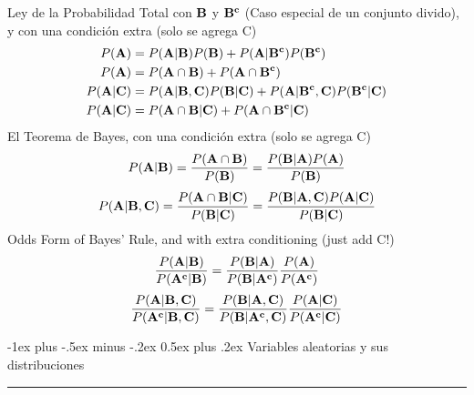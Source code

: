 \documentclass[10pt,landscape]{article}
\makeatletter
\renewcommand{\section}{\@startsection{section}{1}{0mm}%
                                {-1ex plus -.5ex minus -.2ex}%
                                {0.5ex plus .2ex}%
                                {\normalfont\large\bfseries}}
\renewcommand{\subsection}{\@startsection{subsection}{2}{0mm}%
                                {-1explus -.5ex minus -.2ex}%
                                {0.5ex plus .2ex}%
                                {\normalfont\normalsize\bfseries}}
\makeatother
\begin{document}
\begin{multicols}{3}
Ley de la Probabilidad Total con ${\bf B}$ y ${\bf B^c}$ (Caso especial de un conjunto divido), y con una condición extra (solo se agrega C)
   \begin{align*} 
P({\bf A}) &= P({\bf A} | {\bf B})P({\bf B}) + P({\bf A} | {\bf B^c})P({\bf B^c}) \\
P({\bf A}) &= P({\bf A} \cap {\bf B})+ P({\bf A} \cap {\bf B^c}) \\
P({\bf A} | {\bf C}) &= P({\bf A} | {\bf B}, {\bf C})P({\bf B} | {\bf C}) + P({\bf A} | {\bf B^c}, {\bf C})P({\bf B^c} | {\bf C}) \\
P({\bf A} | {\bf C}) &= P({\bf A} \cap {\bf B} | {\bf C})+ P({\bf A} \cap {\bf B^c} | {\bf C})
   \end{align*} 
El Teorema de Bayes, con una condición extra (solo se agrega C)
         \[P({\bf A}|{\bf B}) = \frac{P({\bf A} \cap {\bf B})}{P({\bf B})} = \frac{P({\bf B}|{\bf A})P({\bf A})}{P({\bf B})}\]
         \[P({\bf A}|{\bf B}, {\bf C}) = \frac{P({\bf A} \cap {\bf B} | {\bf C})}{P({\bf B} | {\bf C})} = \frac{P({\bf B}|{\bf A}, {\bf C})P({\bf A} | {\bf C})}{P({\bf B} | {\bf C})}\]
Odds Form of Bayes' Rule, and with extra conditioning (just add C!)
\[\frac{P({\bf A}| {\bf B})}{P({\bf A^c}| {\bf B})} = \frac{P({\bf B}|{\bf A})}{P({\bf B}| {\bf A^c})}\frac{P({\bf A})}{P({\bf A^c})}\]
\[\frac{P({\bf A}| {\bf B}, {\bf C})}{P({\bf A^c}| {\bf B}, {\bf C})} = \frac{P({\bf B}|{\bf A}, {\bf C})}{P({\bf B}| {\bf A^c}, {\bf C})}\frac{P({\bf A} | {\bf C})}{P({\bf A^c} | {\bf C})}\]

\section{Variables aleatorias y sus distribuciones}\smallskip \hrule height 2pt \smallskip


   

\end{multicols}
\end{document}
